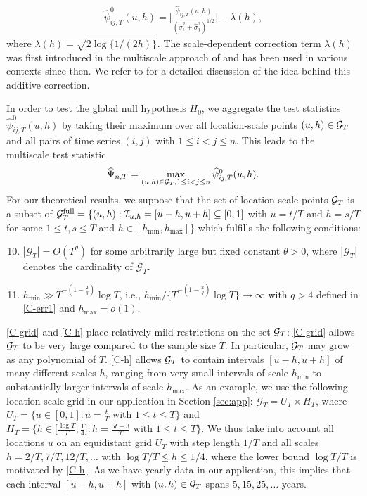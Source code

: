 \documentclass[12pt]{article}
\begin{document}
\begin{align}\label{eq:psi_zero_ij}
\widehat{\psi}^0_{ij, T}(u, h) =  \Big|\frac{\widehat{\psi}_{ij, T}(u, h)}{(\widehat{\sigma}_i^2 + \widehat{\sigma}_j^2)^{1/2}}\Big| - \lambda(h),
\end{align}
where $\lambda(h) = \sqrt{2 \log \{ 1/(2h) \}}$. The scale-dependent correction term $\lambda(h)$ was first introduced in the multiscale approach of \cite{DuembgenSpokoiny2001} and has been used in various contexts since then. We refer to \citet{KhismatullinaVogt2020} for a detailed discussion of the idea behind this additive correction. 


In order to test the global null hypothesis $H_0$, we aggregate the test statistics $\widehat{\psi}^0_{ij, T}(u, h)$ by taking their maximum over all location-scale points $(u,h) \in \mathcal{G}_T$ and all pairs of time series $(i,j)$ with $1 \le i < j \le n$. This leads to the multiscale test statistic 
\[ \widehat{\Psi}_{n,T} = \max_{(u,h) \in \mathcal{G}_T, 1 \le i < j \le n} \widehat{\psi}^0_{ij, T}(u, h). \]
For our theoretical results, we suppose that the set of location-scale points $\mathcal{G}_T$ is a subset of $\mathcal{G}_T^{\text{full}} = \{ (u, h): \mathcal{I}_{u, h} = [u-h,u+h] \subseteq [0,1]$ with $u = t/T$ and $h = s/T$  for some $1 \le t, s \le T$ and $h \in [h_{\min},h_{\max}] \}$ which fulfills the following conditions:
\begin{enumerate}[label=(C\arabic*),leftmargin=1.2cm, itemsep=0pt, parsep=0pt, topsep=3pt]
\setcounter{enumi}{9}

\item \label{C-grid} $|\mathcal{G}_T| = O(T^\theta)$ for some arbitrarily large but fixed constant $\theta > 0$, where $|\mathcal{G}_T|$ denotes the cardinality of $\mathcal{G}_T$. 

\item \label{C-h} $h_{\min} \gg T^{-(1-\frac{2}{q})} \log T$, i.e., $h_{\min} / \{ T^{-(1-\frac{2}{q})} \log T \} \rightarrow \infty$ with $q > 4$ defined in \ref{C-err1} and $h_{\max} = o(1)$.

\end{enumerate}
\ref{C-grid} and \ref{C-h} place relatively mild restrictions on the set $\mathcal{G}_T$: \ref{C-grid} allows $\mathcal{G}_T$ to be very large compared to the sample size $T$. In particular, $\mathcal{G}_T$ may grow as any polynomial of $T$. \ref{C-h} allows $\mathcal{G}_T$ to contain intervals $[u-h,u+h]$ of many different scales $h$, ranging from very small intervals of scale $h_{\min}$ to substantially larger intervals of scale $h_{\max}$.
As an example, we use the following location-scale grid in our application in Section \ref{sec:app}: $\mathcal{G}_T = U_T \times H_T$, where $U_T = \big\{ u \in [0,1]: u = \textstyle{\frac{t}{T}} \text{ with } 1 \le t \le T \big\}$ and $H_T = \big\{ h \in \big[ \textstyle{\frac{\log T}{T}}, \textstyle{\frac{1}{4}} \big]:  h = \textstyle{\frac{5t - 3}{T}} \text{ with } 1 \le t \le T \big\}$. We thus take into account all locations $u$ on an equidistant grid $U_T$ with step length $1/T$ and all scales $h=2/T, 7/T, 12/T,\ldots$ with $\log T /T \le h \le 1/4$, where the lower bound $\log T / T$ is motivated by \ref{C-h}. As we have yearly data in our application, this implies that each interval $[u-h,u+h]$ with $(u,h) \in \mathcal{G}_T$ spans $5, 15, 25, \ldots$ years. 
\end{document}
